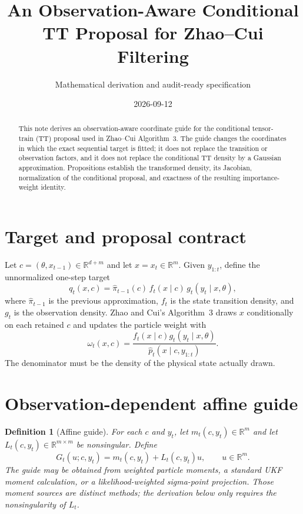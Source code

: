 \documentclass[11pt]{article}
\title{An Observation-Aware Conditional TT Proposal for Zhao--Cui Filtering}
\author{Mathematical derivation and audit-ready specification}
\date{2026-09-12}
\newtheorem{definition}{Definition}
\newcommand{\R}{\mathbb R}
\begin{document}
\maketitle

\begin{abstract}
This note derives an observation-aware coordinate guide for the conditional
tensor-train (TT) proposal used in Zhao--Cui Algorithm~3. The guide changes
the coordinates in which the exact sequential target is fitted; it does not
replace the transition or observation factors, and it does not replace the
conditional TT density by a Gaussian approximation. Propositions establish
the transformed density, its Jacobian, normalization of the conditional
proposal, and exactness of the resulting importance-weight identity.
\end{abstract}

\section{Target and proposal contract}
Let $c=(\theta,x_{t-1})\in\R^{d+m}$ and let $x=x_t\in\R^m$. Given
$y_{1:t}$, define the unnormalized one-step target
\begin{equation}\label{eq:target}
 q_t(x,c)=\widehat\pi_{t-1}(c)\,f_t(x\mid c)\,g_t(y_t\mid x,\theta),
\end{equation}
where $\widehat\pi_{t-1}$ is the previous approximation, $f_t$ is the state
transition density, and $g_t$ is the observation density. Zhao and Cui's
Algorithm~3 draws $x$ conditionally on each retained $c$ and updates the
particle weight with
\begin{equation}\label{eq:weight}
 \omega_t(x,c)=\frac{f_t(x\mid c)g_t(y_t\mid x,\theta)}
 {\widehat p_t(x\mid c,y_{1:t})}.
\end{equation}
The denominator must be the density of the physical state actually drawn.

\section{Observation-dependent affine guide}
\begin{definition}[Affine guide]
For each $c$ and $y_t$, let $m_t(c,y_t)\in\R^m$ and let
$L_t(c,y_t)\in\R^{m\times m}$ be nonsingular. Define
\begin{equation}\label{eq:guide}
 G_t(u;c,y_t)=m_t(c,y_t)+L_t(c,y_t)u,\qquad u\in\R^m.
\end{equation}
The guide may be obtained from weighted particle moments, a standard UKF
moment calculation, or a likelihood-weighted sigma-point projection. Those
moment sources are distinct methods; the derivation below only requires the
nonsingularity of $L_t$.
\end{definition}
\end{document}
